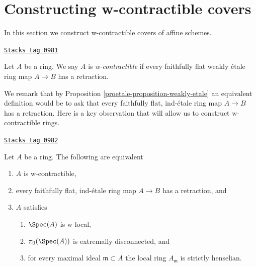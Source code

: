 \section{Constructing w-contractible covers}
\label{proetale-section-w-contractible}
In this section we construct w-contractible covers of affine schemes.

\begin{definition}[W contractible]
\label{proetale-definition-w-contractible}
\href{https://stacks.math.columbia.edu/tag/0981}{\texttt{Stacks tag 0981}}

Let $A$ be a ring. We say $A$ is {\it w-contractible} if every
faithfully flat weakly \'etale ring map $A \to B$ has a retraction.
\end{definition}

We remark that by Proposition \ref{proetale-proposition-weakly-etale}
an equivalent definition would be to ask that every faithfully
flat, ind-\'etale ring map $A \to B$ has a retraction.
Here is a key observation that will allow us to construct
w-contractible rings.

\begin{lemma}
\label{proetale-lemma-w-local-strictly-henselian-extremally-disconnected}
\href{https://stacks.math.columbia.edu/tag/0982}{\texttt{Stacks tag 0982}}

Let $A$ be a ring. The following are equivalent
\begin{enumerate}
\item $A$ is w-contractible,
\item every faithfully flat, ind-\'etale ring map $A \to B$ has
a retraction, and
\item $A$ satisfies
\begin{enumerate}
\item $\Spec(A)$ is w-local,
\item $\pi_0(\Spec(A))$ is extremally disconnected, and
\item for every maximal ideal $\mathfrak m \subset A$ the
local ring $A_\mathfrak m$ is strictly henselian.
\end{enumerate}
\end{enumerate}
\end{lemma}

